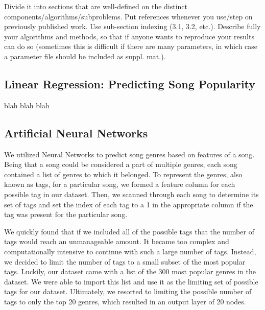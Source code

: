 \documentclass[12pt]{article}
\begin{document}
 Divide it into sections that are well-defined on the distinct components/algorithms/subproblems.
 Put references whenever you use/step on previously published work. Use sub-section
 indexing (3.1, 3.2, etc.). Describe fully your algorithms and methods, so that if anyone wants to
 reproduce your results can do so (sometimes this is difficult if there are many parameters, in
 which case a parameter file should be included as suppl. mat.).

\subsection{Linear Regression: Predicting Song Popularity}
\label{subsec:linearRegression}
blah blah blah

\subsection{Artificial Neural Networks}
\label{subsec:ann}
We utilized Neural Networks to predict song genres based on features of a song. Being that a song could be considered a part of multiple genres, each song contained a list of genres to which it belonged. To represent the genres, also known as tags, for a particular song, we formed a feature column for each possible tag in our dataset. Then, we scanned through each song to determine its set of tags and set the index of each tag to a 1 in the appropriate column if the tag was present for the particular song. 

We quickly found that if we included all of the possible tags that the number of tags would reach an unmanageable amount. It became too complex and computationally intensive to continue with such a large number of tags. Instead, we decided to limit the number of tags to a small subset of the most popular tags. Luckily, our dataset came with a list of the 300 most popular genres in the dataset. We were able to import this list and use it as the limiting set of possible tags for our dataset. Ultimately, we resorted to limiting the possible number of tags to only the top 20 genres, which resulted in an output layer of 20 nodes.
\end{document}
